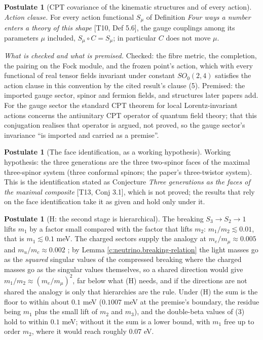 \documentclass[11pt]{article}
\theoremstyle{definition}
\newtheorem{postulate}[theorem]{Postulate}
\theoremstyle{plain}
\begin{document}
\begin{postulate}[CPT covariance of the kinematic structures and of every action]
\emph{Action clause.} For every action functional $S_{\mu}$ of Definition \emph{Four ways a number enters a theory of this shape} [T10, Def 5.6], the gauge couplings among its parameters $\mu$ included, $S_{\mu} \circ C = S_{\mu}$; in particular $C$ does not move $\mu$.

\emph{What is checked and what is premised.} Checked: the fibre metric, the completion, the pairing on the Fock module, and the frozen point's action, which with every functional of real tensor fields invariant under constant $SO_{0}(2,4)$ satisfies the action clause in this convention by the cited result's clause (5). Premised: the imported gauge sector, spinor and fermion fields, and structures later papers add. For the gauge sector the standard CPT theorem for local Lorentz-invariant actions concerns the antiunitary CPT operator of quantum field theory; that this conjugation realises that operator is argued, not proved, so the gauge sector's invariance ``is imported and carried as a premise''.
\end{postulate}

\begin{postulate}[The face identification, as a working hypothesis]\label{c:families.hyp-face-identification}
Working hypothesis: the three generations are the three two-spinor faces of the maximal three-spinor system (three conformal spinors; the paper's three-twistor system). This is the identification stated as Conjecture \emph{Three generations as the faces of the maximal composite} [T13, Conj 3.1], which is not proved; the results that rely on the face identification take it as given and hold only under it.
\end{postulate}

\begin{postulate}[H: the second stage is hierarchical]\label{c:neutrino.h-second-stage-hierarchical}
The breaking $S_{3} \to S_{2} \to 1$ lifts $m_{1}$ by a factor small compared with the factor that lifts $m_{2}$: $m_{1}/m_{2} \lesssim 0.01$, that is $m_{1} \lesssim 0.1$ meV. The charged sectors supply the analogy at $m_{e}/m_{\mu} \approx 0.005$ and $m_{u}/m_{c} \approx 0.002$ \cite{PDG2024}; by Lemma \ref{c:neutrino.breaking-relation} the light masses go as the \emph{squared} singular values of the compressed breaking where the charged masses go as the singular values themselves, so a shared direction would give $m_{1}/m_{2} \approx (m_{e}/m_{\mu})^{2}$, far below what (H) needs, and if the directions are not shared the analogy is only that hierarchies are the rule. Under (H) the sum is the floor to within about $0.1$ meV ($0.1007$ meV at the premise's boundary, the residue being $m_{1}$ plus the small lift of $m_{2}$ and $m_{3}$), and the double-beta values of (3) hold to within $0.1$ meV; without it the sum is a lower bound, with $m_{1}$ free up to order $m_{2}$, where it would reach roughly $0.07$ eV.
\end{postulate}
\end{document}
